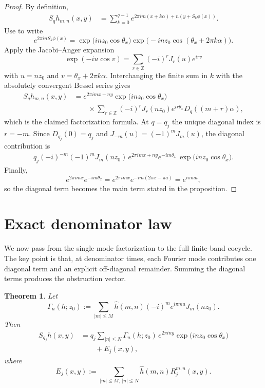\documentclass[11pt,reqno]{amsart}
\newtheorem{theorem}{Theorem}[section]
\theoremstyle{definition}
\newcommand{\Z}{\mathbb{Z}}
\newcommand{\e}[1]{e^{2\pi i #1}}
\newcommand{\abs}[1]{\left\lvert #1 \right\rvert}
\newcommand{\qj}{q_j}
\begin{document}
\begin{proof}
By definition,
\[
\begin{aligned}
S_q h_{m,n}(x,y)
&=
\sum_{k=0}^{q-1}\e{m(x+k\alpha)+n(y+S_k\phi(x))}.
\end{aligned}
\]
Use  to write
\[
\e{nS_k\phi(x)}
=
\exp\!\bigl(i n z_0\cos\theta_x\bigr)
\exp\!\bigl(-i n z_0\cos(\theta_x+2\pi k\alpha)\bigr).
\]
Apply the Jacobi--Anger expansion
\[
\exp(-iu\cos v)=\sum_{r\in\Z}(-i)^r J_r(u)e^{i r v}
\]
with $u=nz_0$ and $v=\theta_x+2\pi k\alpha$. Interchanging the finite sum in $k$ with the
absolutely convergent Bessel series gives
\[
\begin{aligned}
S_q h_{m,n}(x,y)
&=
\e{mx+ny}\exp\!\bigl(i n z_0\cos\theta_x\bigr)\\
&\qquad \times \sum_{r\in\Z}(-i)^r J_r(nz_0)e^{i r\theta_x} D_q((m+r)\alpha),
\end{aligned}
\]
which is the claimed factorization formula. At $q=\qj$ the unique diagonal index is $r=-m$.
Since $D_{\qj}(0)=\qj$ and $J_{-m}(u)=(-1)^m J_m(u)$, the diagonal contribution is
\[
\begin{aligned}
\qj (-i)^{-m}(-1)^m J_m(nz_0)\,\e{mx+ny} e^{-im\theta_x}
\,\exp\!\bigl(i n z_0\cos\theta_x\bigr).
\end{aligned}
\]
Finally,
\[
\e{mx}e^{-im\theta_x}
=
e^{2\pi i m x}e^{-im(2\pi x-\pi a)}
=
e^{i\pi m a},
\]
so the diagonal term becomes the main term stated in the proposition.
\end{proof}

\section{Exact denominator law}\label{sec:obstruction}

We now pass from the single-mode factorization to the full finite-band cocycle. The key point is
that, at denominator times, each Fourier mode contributes one diagonal term and an explicit
off-diagonal remainder. Summing the diagonal terms produces the obstruction vector.

\begin{theorem}\label{thm:obstruction}
Let
\[
\Gamma_n(h;z_0)
:=
\sum_{\abs{m}\le M}\widehat h(m,n)(-i)^m e^{i\pi m a} J_m(n z_0).
\]
Then
\[
\begin{aligned}
S_{\qj} h(x,y)
&=
\qj \sum_{\abs{n}\le N}\Gamma_n(h;z_0)\,\e{ny}\exp\!\bigl(i n z_0\cos\theta_x\bigr)\\
&\qquad +E_j(x,y),
\end{aligned}
\]
where
\[
E_j(x,y)
:=
\sum_{\abs{m}\le M,\ \abs{n}\le N}\widehat h(m,n) R_j^{m,n}(x,y).
\]
\end{theorem}
\end{document}
